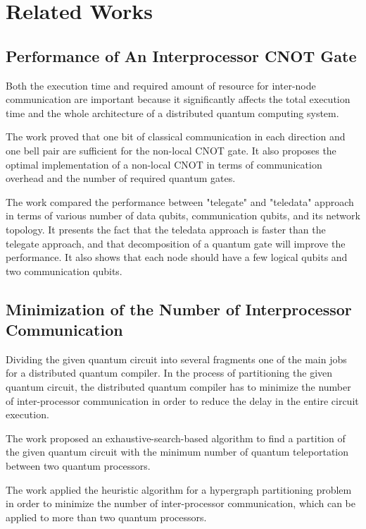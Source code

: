 \chapter{Related Works}
\label{related works}

\section{Performance of  An Interprocessor CNOT Gate}
Both the execution time and required amount of resource for inter-node communication are important because it significantly affects the total execution time and the whole architecture of a distributed quantum computing system. 

 The work \cite{gateteleportation} proved that one bit of classical communication in each direction and one bell pair are sufficient for the non-local CNOT gate.  It also proposes the optimal implementation of a non-local CNOT in terms of communication overhead and the number of required quantum gates. 
 
 The work \cite{arithmetic} compared the performance between "telegate" and "teledata" approach in terms of various number of data qubits, communication qubits, and its network topology.  It presents the fact that the teledata approach is faster than the telegate approach, and that decomposition of a quantum gate will improve the performance.  It also shows that each node should have a few logical qubits and two communication qubits.

\section{Minimization of the Number of Interprocessor Communication}

Dividing the given quantum circuit into several fragments one of the main jobs for a distributed quantum compiler.  In the process of partitioning the given quantum circuit, the distributed quantum compiler has to minimize the number of inter-processor communication in order to reduce the delay in the entire circuit execution.  

The work \cite{exhaustivesearch} proposed an exhaustive-search-based algorithm to find a partition of the given quantum circuit with the minimum number of quantum teleportation between two quantum processors.

The work \cite{hypergraph} applied the heuristic algorithm for a hypergraph partitioning problem in order to minimize the number of inter-processor communication, which can be applied to more than two quantum processors.

